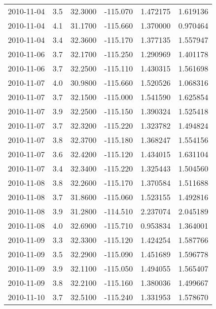 \begin{tabular}{lrrrrr}
2010-11-04 &       3.5 &  32.3000 &  -115.070 &         1.472175 &         1.619136 \\
2010-11-04 &       4.1 &  31.1700 &  -115.660 &         1.370000 &         0.970464 \\
2010-11-04 &       3.4 &  32.3600 &  -115.170 &         1.377135 &         1.557947 \\
2010-11-06 &       3.7 &  32.1700 &  -115.250 &         1.290969 &         1.401178 \\
2010-11-06 &       3.7 &  32.2500 &  -115.110 &         1.430315 &         1.561698 \\
2010-11-07 &       4.0 &  30.9800 &  -115.660 &         1.520526 &         1.068316 \\
2010-11-07 &       3.7 &  32.1500 &  -115.000 &         1.541590 &         1.625854 \\
2010-11-07 &       3.9 &  32.2500 &  -115.150 &         1.390324 &         1.525418 \\
2010-11-07 &       3.7 &  32.3200 &  -115.220 &         1.323782 &         1.494824 \\
2010-11-07 &       3.8 &  32.3700 &  -115.180 &         1.368247 &         1.554156 \\
2010-11-07 &       3.6 &  32.4200 &  -115.120 &         1.434015 &         1.631104 \\
2010-11-07 &       3.4 &  32.3400 &  -115.220 &         1.325443 &         1.504560 \\
2010-11-08 &       3.8 &  32.2600 &  -115.170 &         1.370584 &         1.511688 \\
2010-11-08 &       3.7 &  31.8600 &  -115.060 &         1.523155 &         1.492816 \\
2010-11-08 &       3.9 &  31.2800 &  -114.510 &         2.237074 &         2.045189 \\
2010-11-08 &       4.0 &  32.6900 &  -115.710 &         0.953834 &         1.364001 \\
2010-11-09 &       3.3 &  32.3300 &  -115.120 &         1.424254 &         1.587766 \\
2010-11-09 &       3.5 &  32.2900 &  -115.090 &         1.451689 &         1.596778 \\
2010-11-09 &       3.9 &  32.1100 &  -115.050 &         1.494055 &         1.565407 \\
2010-11-09 &       3.8 &  32.2100 &  -115.160 &         1.380036 &         1.499667 \\
2010-11-10 &       3.7 &  32.5100 &  -115.240 &         1.331953 &         1.578670 \\

\end{tabular}
